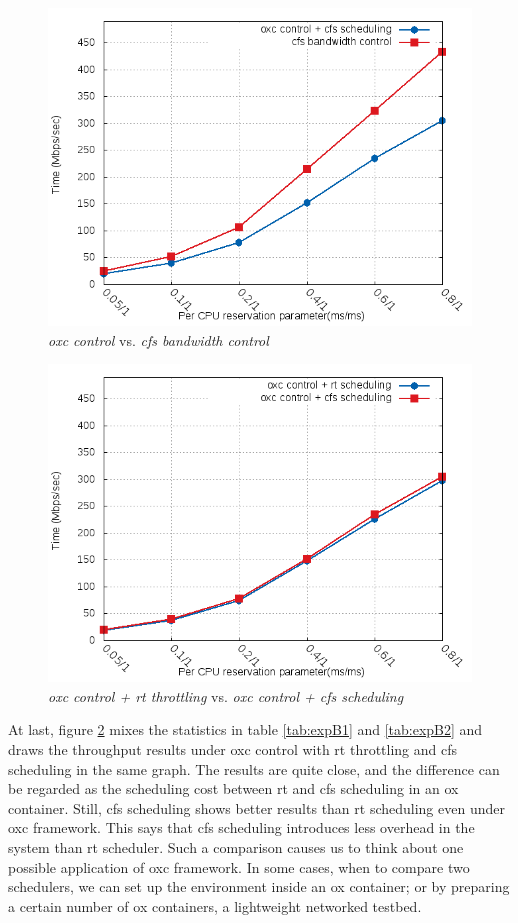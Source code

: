 \begin{figure}[htbp]
        \centering
        \includegraphics[width=\textwidth, totalheight=0.4\textheight]{images/expB2}
        \caption{\emph{oxc control} vs. \emph{cfs bandwidth control}}
        \label{fig:expB2}
\end{figure}
\begin{figure}[htbp]
        \centering
        \includegraphics[width=\textwidth, totalheight=0.4\textheight]{images/expB3}
        \caption{\emph{oxc control + rt throttling} vs. \emph{oxc control + cfs scheduling}}
        \label{fig:expB3}
\end{figure}
At last, figure \ref{fig:expB3} mixes the statistics in table \ref{tab:expB1}
and \ref{tab:expB2} and draws the throughput results under oxc control with
rt throttling and cfs scheduling in the same graph.
The results are quite close, and the difference can be regarded as
the scheduling cost between rt and cfs scheduling in an ox container.
Still, cfs scheduling shows better results than rt scheduling even under 
oxc framework. This says that cfs scheduling introduces less overhead in the
system than rt scheduler. Such a comparison causes us to think about one
possible application of oxc framework. In some cases, when to compare two
schedulers, we can set up the environment inside an ox container; or by preparing
a certain number of ox containers, a lightweight networked testbed. 


